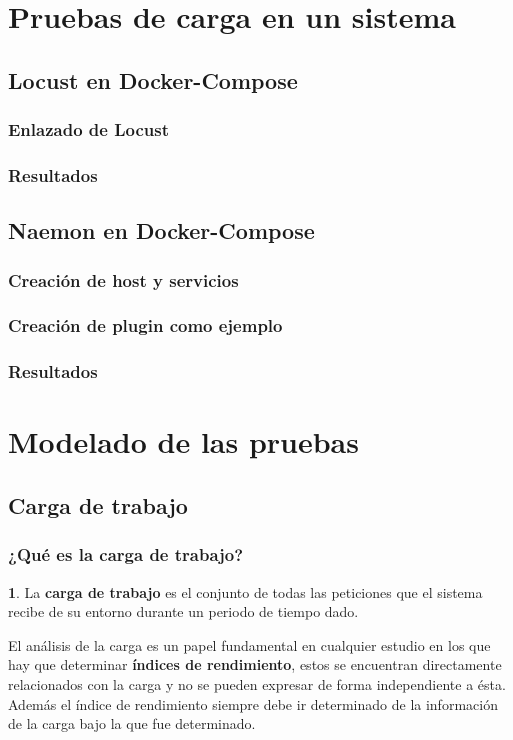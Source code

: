 \documentclass{beamer}
\theoremstyle{plain}
\theoremstyle{definition}
\newtheorem{defn}[thm]{}
\theoremstyle{plain}
\theoremstyle{definition}
\theoremstyle{remark}
\theoremstyle{definition}
\begin{document}
\section{Pruebas de carga en un sistema} %


\subsection{Locust en Docker-Compose}
\begin{frame}
	\frametitle{Enlazado de Locust}
	
\end{frame}
\begin{frame}
	\frametitle{Resultados}
	\end{frame}
\subsection{Naemon en Docker-Compose}
\begin{frame}
	\frametitle{Creación de host y servicios}
	
\end{frame}
\begin{frame}
	\frametitle{Creación de plugin como ejemplo}
	
\end{frame}
\begin{frame}
	\frametitle{Resultados}
	\end{frame}


\section{Modelado de las pruebas} %
\subsection{Carga de trabajo}
\begin{frame}
	\frametitle{¿Qué es la carga de trabajo?}
	\begin{defn}
		La \textbf{carga de trabajo} es el conjunto de todas las peticiones que el sistema recibe de su entorno
		durante un periodo de tiempo dado.
	\end{defn}
El análisis de la carga es un papel fundamental en cualquier
estudio en los que hay que determinar \textbf{índices de rendimiento}, estos se
encuentran directamente relacionados con la carga y no se pueden expresar
de forma independiente a ésta. Además el índice de rendimiento siempre debe
ir determinado de la información de la carga bajo la que fue determinado.
	
\end{frame}
\end{document}
